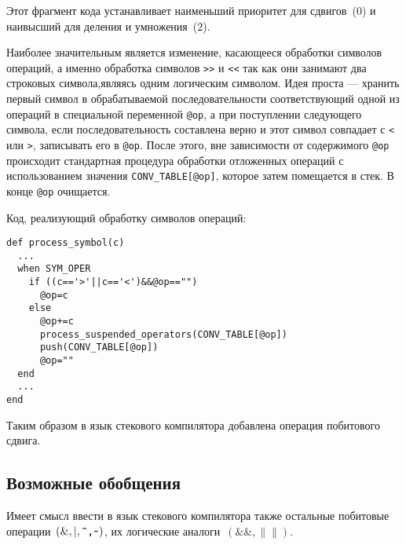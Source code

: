 Этот фрагмент кода устанавливает наименьший приоритет для сдвигов~($0$) и наивысший для
деления и умножения~($2$).

Наиболее значительным является изменение, касающееся обработки символов операций,
а именно обработка символов \verb|>>| и \verb|<<| так как они занимают два
строковых символа,являясь одним логическим символом. Идея проста --- хранить
первый символ в обрабатываемой последовательности соответствующий одной из
операций в специальной переменной \verb|@op|, а при поступлении следующего
символа, если последовательность составлена верно и этот символ совпадает с
\verb|<| или \verb|>|, записывать его в \verb|@op|. После этого, вне зависимости
от содержимого \verb|@op| происходит стандартная процедура обработки отложенных
операций с использованием значения \verb|CONV_TABLE[@op]|, которое затем
помещается в стек. В конце \verb|@op| очищается.

\newpage

Код, реализующий обработку символов операций:
\begin{lstlisting}
def process_symbol(c)
  ...
  when SYM_OPER
    if ((c=='>'||c=='<')&&@op=="")
      @op=c
    else
      @op+=c
      process_suspended_operators(CONV_TABLE[@op])
      push(CONV_TABLE[@op])
      @op=""
  end
  ...
end
\end{lstlisting}

Таким образом в язык стекового компилятора добавлена операция побитового сдвига.
\subsection{Возможные обобщения}
Имеет смысл ввести в язык стекового компилятора также остальные побитовые операции~$\left(\&,|,\verb|^,~|\right)$, их логические аналоги~$\left(\&\&,\|\|\right)$.
